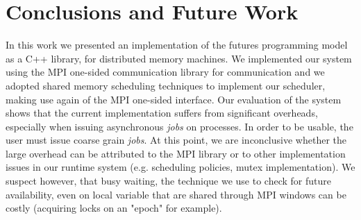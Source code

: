 \chapter{Conclusions and Future Work}
In this work we presented an implementation of the futures programming model as a C++ library,
for distributed memory machines.  We implemented our system using the MPI one-sided communication
library for communication and we adopted shared memory scheduling techniques to implement 
our scheduler, making use again of the MPI one-sided interface.  Our evaluation of the system shows
that the current implementation suffers from significant overheads, especially when issuing asynchronous
\emph{jobs} on processes. In order to be usable, the user must issue coarse grain \emph{jobs}.  At this
point, we are inconclusive whether the large overhead can be attributed to the MPI library or to other
implementation issues in our runtime system (e.g. scheduling policies, mutex implementation).  We suspect
however, that busy waiting, the technique we use to check for future availability, 
even on local variable that are shared through MPI windows can be costly (acquiring locks on an "epoch" for example).



